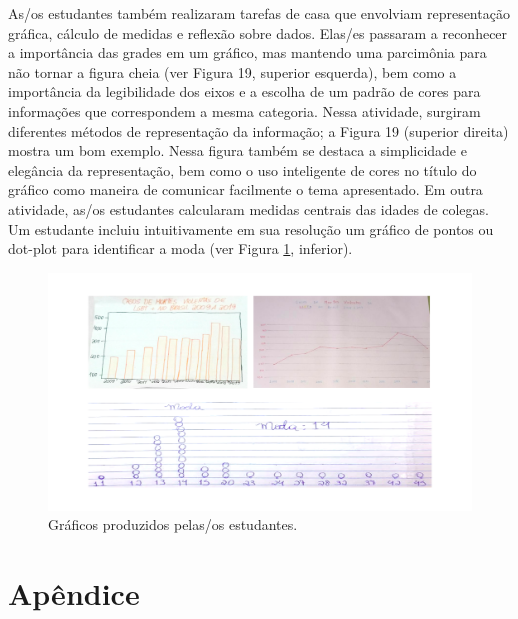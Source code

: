 \documentclass[
]{book}
\begin{document}
As/os estudantes também realizaram tarefas de casa que envolviam representação gráfica, cálculo de medidas e reflexão sobre dados. Elas/es passaram a reconhecer a importância das grades em um gráfico, mas mantendo uma parcimônia para não tornar a figura cheia (ver Figura 19, superior esquerda), bem como a importância da legibilidade dos eixos e a escolha de um padrão de cores para informações que correspondem a mesma categoria. Nessa atividade, surgiram diferentes métodos de representação da informação; a Figura 19 (superior direita) mostra um bom exemplo. Nessa figura também se destaca a simplicidade e elegância da representação, bem como o uso inteligente de cores no título do gráfico como maneira de comunicar facilmente o tema apresentado. Em outra atividade, as/os estudantes calcularam medidas centrais das idades de colegas. Um estudante incluiu intuitivamente em sua resolução um gráfico de pontos ou dot-plot para identificar a moda (ver Figura \ref{fig:exercestud}, inferior).

\begin{figure}
\includegraphics[width=18.97in]{images/exercico_estudantes} \caption{Gráficos produzidos pelas/os estudantes.}\label{fig:exercestud}
\end{figure}

\hypertarget{apuxeandice}{%
\chapter*{Apêndice}\label{apuxeandice}}

  
\end{document}
